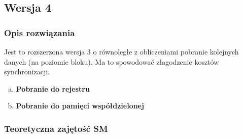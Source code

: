 \newpage
\subsection{Wersja 4}

\subsubsection{Opis rozwiązania}

Jest to rozszerzona wersja 3 o równoległe z obliczeniami pobranie kolejnych danych (na poziomie bloku). Ma to spowodować złagodzenie kosztów synchronizacji.

\begin{enumerate}[(a)]

\item \textbf{Pobranie do rejestru} \newline



\item \textbf{Pobranie do pamięci współdzielonej} \newline



\end{enumerate}

\newpage
\subsubsection{Teoretyczna zajętość SM}

